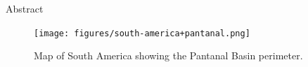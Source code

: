 \documentclass[final]{beamer}
\newlength{\colwidth}
\begin{document}
\begin{frame}[t]
\begin{columns}[t]
\begin{column}{\colwidth}
\begin{block}{Abstract}
    \begin{figure}
      \centering
      \texttt{[image: figures/south-america+pantanal.png]}
      \caption{ Map of South America showing the Pantanal Basin perimeter.}
      \label{fig:pantanal-basin}
    \end{figure}

  \end{block}





    

\end{column}
\end{columns}
\end{frame}
\end{document}
